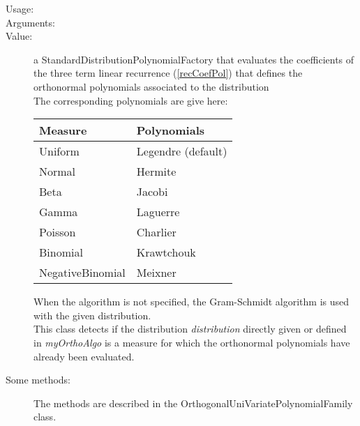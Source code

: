 \begin{description}
\item[Usage:] \rule{0pt}{1em}


\item[Arguments:] \rule{0pt}{1em}


\item[Value:] a StandardDistributionPolynomialFactory that evaluates the coefficients of the three term linear recurrence (\ref{recCoefPol}) that defines the orthonormal polynomials associated to the distribution\\

The corresponding polynomials are give here:
\begin{tabular}{l|l}
  Measure & Polynomials \\
  \hline
  Uniform & Legendre (default) \\
  Normal & Hermite \\
  Beta & Jacobi\\
  Gamma & Laguerre \\
  Poisson & Charlier \\
  Binomial & Krawtchouk \\
  NegativeBinomial & Meixner \\
\end{tabular}

When the algorithm is not specified, the Gram-Schmidt algorithm is used with the given distribution.\\
This class detects if the distribution \textit{distribution} directly given or defined in \textit{myOrthoAlgo} is a measure for which the orthonormal polynomials have already been evaluated.

\item[Some methods:] The methods are described in the OrthogonalUniVariatePolynomialFamily class.

\end{description}





